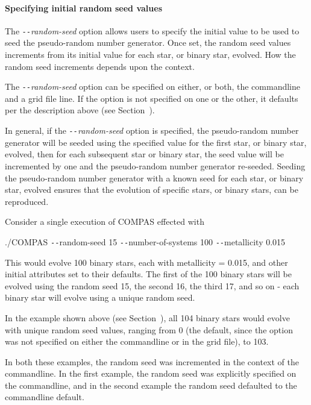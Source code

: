 \paragraph{Specifying initial random seed values}\label{sec:RandomSeed}\mbox{}

The \textit{\texttt{-{}-}random-seed} option allows users to specify the initial value to be used to seed the pseudo-random number generator. Once set, the random seed values increments from its initial value for each star, or binary star, evolved. How the random seed increments depends upon the context.

The \textit{\texttt{-{}-}random-seed} option can be specified on either, or both, the commandline and a grid file line. If the option is not specified on one or the other, it defaults per the description above (see Section~).

In general, if the \textit{\texttt{-{}-}random-seed} option is specified, the pseudo-random number generator will be seeded using the specified value for the first star, or binary star, evolved, then for each subsequent star or binary star, the seed value will be incremented by one and the pseudo-random number generator re-seeded. Seeding the pseudo-random number generator with a known seed for each star, or binary star, evolved ensures that the evolution of specific stars, or binary stars, can be reproduced.

Consider a single execution of COMPAS effected with

\tabto{3em}./COMPAS \texttt{-{}-}random-seed 15 \texttt{-{}-}number-of-systems 100 \texttt{-{}-}metallicity 0.015

\bigskip
This would evolve 100 binary stars, each with metallicity = 0.015, and other initial attributes set to their defaults. The first of the 100 binary stars will be evolved using the random seed 15, the second 16, the third 17, and so on - each binary star will evolve using a unique random seed.

In the example shown above (see Section~), all 104 binary stars would evolve with unique random seed values, ranging from 0 (the default, since the option was not specified on either the commandline or in the grid file), to 103.

In both these examples, the random seed was incremented in the context of the commandline.  In the first example, the random seed was explicitly specified on the commandline, and in the second example the random seed defaulted to the commandline default.

